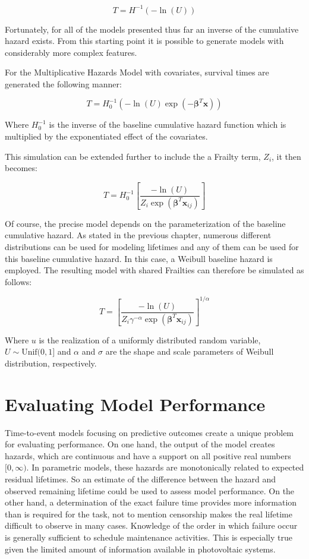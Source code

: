 $$ T = H^{-1}(-\ln(U)) $$

Fortunately, for all of the models presented thus far an inverse of the cumulative hazard exists. From this starting point it is possible to generate models with considerably more complex features.

For the Multiplicative Hazards Model with covariates, survival times are generated the following manner\cite{Bender2005}:

$$ T = H_0^{-1}(-\ln(U) \exp(-\boldsymbol\beta^T \textbf{x})) $$

Where $H_0^{-1}$ is the inverse of the baseline cumulative hazard function which is multiplied by the exponentiated effect of the covariates. 

This simulation can be extended further to include the a Frailty term, $Z_i$, it then becomes\cite{Romdhane2015}:

$$ T = H_0^{-1}\left [\frac{-\ln(U)}{Z_{i} \exp(\boldsymbol\beta^T \textbf{x}_{ij})}  \right ] $$



Of course, the precise model depends on the parameterization of the baseline cumulative hazard. As stated in the previous chapter, numerous different distributions can be used for modeling lifetimes and any of them can be used for this baseline cumulative hazard. In this case, a Weibull baseline hazard is employed. The resulting model with shared Frailties can therefore be simulated as follows:

$$T = \left [\frac{- \ln(U) }{Z_{i} \gamma^{-\alpha}  \exp(\boldsymbol\beta^T \textbf{x}_{ij})}  \right ]^{1/\alpha} $$

Where $u$ is the realization of a uniformly distributed random variable, $U \sim \text{Unif}(0,1]$ and $\alpha$ and $\sigma$ are the shape and scale parameters of Weibull distribution, respectively.



\section*{Evaluating Model Performance}


Time-to-event models focusing on predictive outcomes create a unique problem for evaluating performance. On one hand, the output of the model creates hazards, which are continuous and have a support on all positive real numbers $[0, \infty)$. In parametric models, these hazards are monotonically related to expected residual lifetimes. So an estimate of the difference between the hazard and observed remaining lifetime could be used to assess model performance. On the other hand, a determination of the exact failure time provides more information than is required for the task, not to mention censorship makes the real lifetime difficult to observe in many cases. Knowledge of the order in which failure occur is generally sufficient to schedule maintenance activities. This is especially true given the limited amount of information available in photovoltaic systems. 

